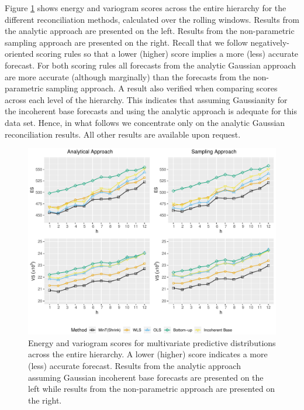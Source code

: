 \documentclass[12pt]{article}
\theoremstyle{definition}
\begin{document}
Figure \ref{fig:Scores_Overall} shows energy and variogram scores across the entire hierarchy for the different reconciliation methods, calculated over the rolling windows. Results from the analytic approach are presented on the left. Results from the non-parametric sampling approach are presented on the right. Recall that we follow negatively-oriented scoring rules so that a lower (higher) score implies a more (less) accurate forecast. For both scoring rules all forecasts from the analytic Gaussian approach are more accurate (although marginally) than the forecasts from the non-parametric sampling approach. A result also verified when comparing scores across each level of the hierarchy. This indicates that assuming Gaussianity for the incoherent base forecasts and using the analytic approach is adequate for this data set. Hence, in what follows we concentrate only on the analytic Gaussian reconciliation results. All other results are available upon request.

\begin{figure}
	\centering
	\small
    \includegraphics[width=.95\textwidth]{Empirical-results/Results-ARIMA/RawScore_Overall.pdf}
	\caption{Energy and variogram scores for multivariate predictive distributions across the entire hierarchy. A lower (higher) score indicates a more (less) accurate forecast. Results from the analytic approach assuming Gaussian incoherent base forecasts are presented on the left while results from the non-parametric approach are presented on the right.} \label{fig:Scores_Overall}
\end{figure}
\end{document}
